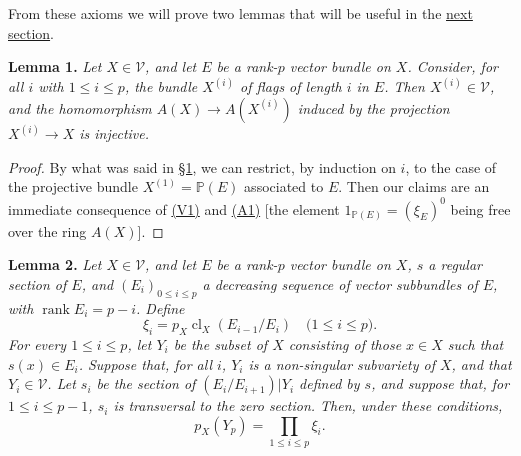 \documentclass{article}
\newenvironment{itenv}[1]
  {\phantomsection\par\medskip\noindent\textbf{#1.}\itshape}
  {\medskip}
\renewcommand{\cal}[1]{{\mathcal{#1}}}
\renewcommand{\leq}{\leqslant}
\DeclareMathOperator{\rank}{rank}
\DeclareMathOperator{\cl}{cl}
\begin{document}
From these axioms we will prove two lemmas that will be useful in the \hyperref[section3]{next section}.

\begin{itenv}{Lemma 1}
\label{lemma1}
  Let $X\in\cal{V}$, and let $E$ be a rank-$p$ vector bundle on $X$.
  Consider, for all $i$ with $1\leq i\leq p$, the bundle $X^{(i)}$ of flags of length $i$ in $E$.
  Then $X^{(i)}\in\cal{V}$, and the homomorphism $A(X)\to A(X^{(i)})$ induced by the projection $X^{(i)}\to X$ is \emph{injective}.
\end{itenv}

\begin{proof}
  By what was said in \hyperref[section1]{\S1}, we can restrict, by induction on $i$, to the case of the projective bundle $X^{(1)}=\mathbb{P}(E)$ associated to $E$.
  Then our claims are an immediate consequence of \hyperref[axiomV1]{(V1)} and \hyperref[axiomA1]{(A1)} [the element $1_{\mathbb{P}(E)}=(\xi_E)^0$ being free over the ring $A(X)$].
\end{proof}

\begin{itenv}{Lemma 2}
\label{lemma2}
  Let $X\in\cal{V}$, and let $E$ be a rank-$p$ vector bundle on $X$, $s$ a regular section of $E$, and $(E_i)_{0\leq i\leq p}$ a decreasing sequence of vector subbundles of $E$, with $\rank E_i=p-i$.
  Define
  \[
    \xi_i = p_X\cl_X(E_{i-1}/E_i)
    \quad\mbox{($1\leq i\leq p$).}
  \]
  For every $1\leq i\leq p$, let $Y_i$ be the subset of $X$ consisting of those $x\in X$ such that $s(x)\in E_i$.
  Suppose that, for all $i$, $Y_i$ is a non-singular subvariety of $X$, and that $Y_i\in\cal{V}$.
  Let $s_i$ be the section of $(E_i/E_{i+1})|Y_i$ defined by $s$, and suppose that, for $1\leq i\leq p-1$, $s_i$ is transversal to the zero section.
  Then, under these conditions,
  \[
    p_X(Y_p) = \prod_{1\leq i\leq p}\xi_i.
  \]
\end{itenv}
\end{document}
